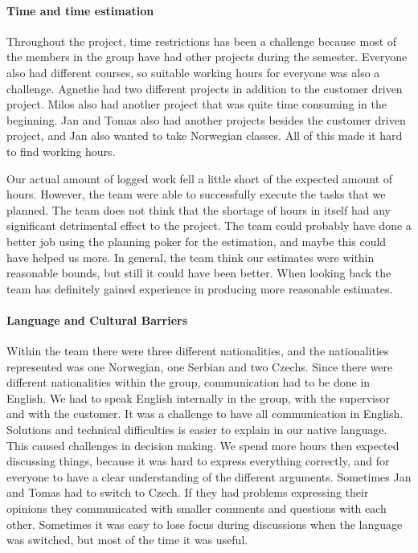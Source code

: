 \paragraph{Time and time estimation}

Throughout the project, time restrictions has been a challenge because most of the members in the group have had other projects during the semester. Everyone also had different courses, so suitable working hours for everyone was also a challenge. Agnethe had two different projects in addition to the customer driven project. Milos also had another project that was quite time consuming in the beginning. Jan and Tomas also had another projects besides the customer driven project, and Jan also wanted to take Norwegian classes. All of this made it hard to find working hours. 

Our actual amount of logged work fell a little short of the expected amount of hours. However, the team were able to successfully execute the tasks that we planned.   
The team does not think that the shortage of hours in itself had any significant detrimental effect to the project. The team could probably have done a better job using the planning poker for the estimation, and maybe this could have helped us more. In general, the team think our estimates were within reasonable bounds, but still it could have been better. When looking back the team has definitely gained experience in producing more reasonable estimates.

\paragraph{Language and Cultural Barriers}

Within the team there were three different nationalities, and the nationalities represented was one Norwegian, one Serbian and two Czechs. Since there were different nationalities within the group, communication had to be done in English. We had to speak English internally in the group, with the supervisor and with the customer. It was a challenge to have all communication in English. Solutions and 
technical difficulties is easier to explain in our native language. This caused challenges in decision making. We spend more hours then expected discussing things, because it was hard to express everything correctly, and for everyone to have a clear understanding of the different arguments. Sometimes Jan and Tomas had to switch to Czech. If they had problems expressing their opinions they communicated with smaller comments and questions with each other. Sometimes it was easy to lose focus during discussions when the language was switched, but most of the time it was useful.

